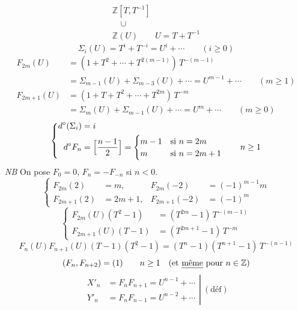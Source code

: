 \documentclass[11pt,a4paper]{article}
\begin{document}
\[
  \begin{array}{l}
    \mathbb{Z}[T, T^{-1}] \\
    \quad \cup \\
    \mathbb{Z}(U) \qquad U = T + T^{-1}
  \end{array}
\]
\[
  \Sigma_i(U) = T^i + T^{-i} = U^i + \cdots \qquad (i \geq 0)
\]
\[
  \begin{aligned}
    F_{2m}(U) &= (1 + T^2 + \cdots + T^{2(m-1)})\, T^{-(m-1)}\\
    &= \Sigma_{m-1}(U) + \Sigma_{m-3}(U) + \cdots = U^{m-1} + \cdots \qquad (m \geq 1)\\
    F_{2m+1}(U) &= (1 + T + T^2 + \cdots + T^{2m})\, T^{-m}\\
    &= \Sigma_m(U) + \Sigma_{m-1}(U) + \cdots = U^m + \cdots \qquad (m \geq 0)
  \end{aligned}
\]
\[
  \left\{
  \begin{aligned}
    d^\circ(\Sigma_i) &= i\\
    d^\circ F_n &= \Bigl[\frac{n-1}{2}\Bigr] = \begin{cases} m-1 & \text{si } n = 2m\\ m & \text{si } n = 2m+1 \end{cases} \qquad n \geq 1
  \end{aligned}
  \right.
\]
\emph{NB} On pose $F_0 = 0$, $F_n = -F_{-n}$ si $n < 0$. 
\[
  \left\{
  \begin{aligned}
    F_{2m}(2) &= m, & F_{2m}(-2) &= (-1)^{m-1} m\\
    F_{2m+1}(2) &= 2m+1, & F_{2m+1}(-2) &= (-1)^m
  \end{aligned}
  \right.
\]
\[
  \left\{
  \begin{aligned}
    F_{2m}(U)(T^2 - 1) &= (T^{2m} - 1)\, T^{-(m-1)}\\
    F_{2m+1}(U)(T - 1) &= (T^{2m+1} - 1)\, T^{-m}
  \end{aligned}
  \right.
\]
\[
  F_n(U) F_{n+1}(U) (T-1)(T^2-1) = (T^n - 1)(T^{n+1} - 1)\, T^{-(n-1)}
\]
\[
  (F_n, F_{n+2}) = (1) \qquad n \geq 1 \quad (\text{et \uncertain{même} pour } n \in \mathbb{Z})
\]
\[
  \left.
  \begin{aligned}
    X'_n &= F_n F_{n+1} = U^{n-1} + \cdots\\
    Y'_n &= F_n F_{n-1} = U^{n-2} + \cdots
  \end{aligned}
  \right| \ (\text{déf})
\]
\end{document}
